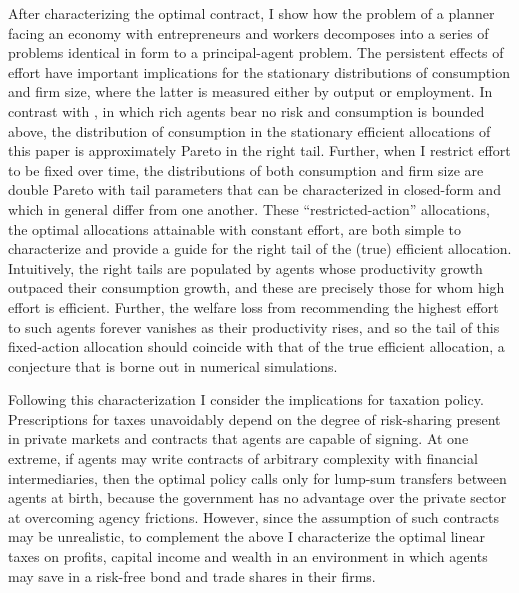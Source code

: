 \documentclass[11pt]{article}
\theoremstyle{plain}
\begin{document}
 
After characterizing the optimal contract, I show how the problem of a planner facing an economy with entrepreneurs and workers decomposes into a series of problems identical in form to a principal-agent problem. The persistent effects of effort have important implications for the stationary distributions of consumption and firm size, where the latter is measured either by output or employment. In contrast with \cite{sannikov_continuous-time_2008}, in which rich agents bear no risk and consumption is bounded above, the distribution of consumption in the stationary efficient allocations of this paper is approximately Pareto in the right tail. Further, when I restrict effort to be fixed over time, the distributions of both consumption and firm size are double Pareto with tail parameters that can be characterized in closed-form and which in general differ from one another. These ``restricted-action'' allocations, the optimal allocations attainable with constant effort, are both simple to characterize and provide a guide for the right tail of the (true) efficient allocation. Intuitively, the right tails are populated by agents whose productivity growth outpaced their consumption growth, and these are precisely those for whom high effort is efficient. Further, the welfare loss from recommending the highest effort to such agents forever vanishes as their productivity rises, and so the tail of this fixed-action allocation should coincide with that of the true efficient allocation, a conjecture that is borne out in numerical simulations. 


Following this characterization I consider the implications for taxation policy. Prescriptions for taxes unavoidably depend on the degree of risk-sharing present in private markets and contracts that agents are capable of signing. At one extreme, if agents may write contracts of arbitrary complexity with financial intermediaries, then the optimal policy calls only for lump-sum transfers between agents at birth, because the government has no advantage over the private sector at overcoming agency frictions. However, since the assumption of such contracts may be unrealistic, to complement the above I characterize the optimal linear taxes on profits, capital income and wealth in an environment in which agents may save in a risk-free bond and trade shares in their firms. 
\end{document}
